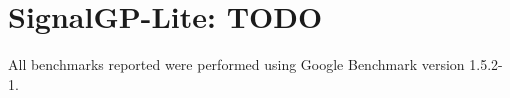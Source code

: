 \chapter{SignalGP-Lite: TODO}
\label{ch:sgp-lite-appendix}

All benchmarks reported were performed using Google Benchmark version 1.5.2-1.





